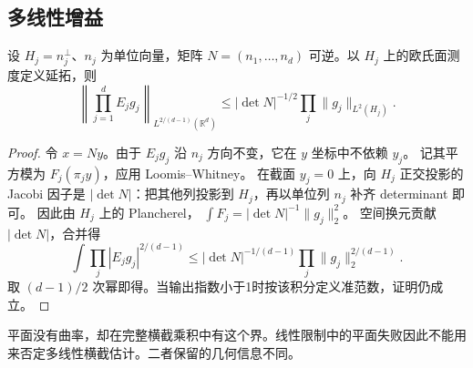 \subsection{多线性增益}
\label{b2:subsec:250203}

\begin{proposition}[平直横截延拓]\label{b2:prop:25-flat-extension}
设 \(H_j=n_j^\perp\)、\(n_j\) 为单位向量，矩阵
\(N=(n_1,\ldots,n_d)\) 可逆。以 \(H_j\) 上的欧氏面测度定义延拓，则
\[
 \left\|\prod_{j=1}^dE_jg_j\right\|_{L^{2/(d-1)}(\mathbb R^d)}
 \le|\det N|^{-1/2}\prod_j\|g_j\|_{L^2(H_j)}.
\]
\end{proposition}
\begin{proof}
令 \(x=Ny\)。由于 \(E_jg_j\) 沿 \(n_j\) 方向不变，它在 \(y\) 坐标中不依赖 \(y_j\)。
记其平方模为 \(F_j(\pi_jy)\)，应用 Loomis–Whitney。
在截面 \(y_j=0\) 上，向 \(H_j\) 正交投影的 Jacobi 因子是 \(|\det N|\)：把其他列投影到 \(H_j\)，再以单位列 \(n_j\) 补齐 determinant 即可。
因此由 \(H_j\) 上的 Plancherel，
\(\int F_j=|\det N|^{-1}\|g_j\|_2^2\)。
空间换元贡献 \(|\det N|\)，合并得
\[
 \int\prod_j|E_jg_j|^{2/(d-1)}
 \le|\det N|^{-1/(d-1)}
             \prod_j\|g_j\|_2^{2/(d-1)}.
\]
取 \((d-1)/2\) 次幂即得。当输出指数小于1时按该积分定义准范数，证明仍成立。
\end{proof}
平面没有曲率，却在完整横截乘积中有这个界。线性限制中的平面失败因此不能用来否定多线性横截估计。二者保留的几何信息不同。
